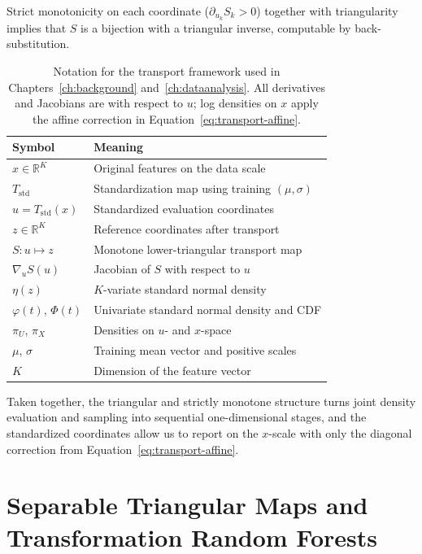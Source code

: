 \documentclass[11pt,a4paper,twoside]{book}\usepackage[]{graphicx}\usepackage[]{xcolor}
\begin{document}
Strict monotonicity on each coordinate ($\partial_{u_k} S_k>0$) together with triangularity implies that $S$ is a bijection with a triangular inverse, computable by back-substitution.

\begin{table}[t]
  \centering
  \caption{Notation for the transport framework used in Chapters~\ref{ch:background} and~\ref{ch:dataanalysis}. All derivatives and Jacobians are with respect to $u$; log densities on $x$ apply the affine correction in Equation~\eqref{eq:transport-affine}.}
  \label{tab:transport-notation}
  \begin{tabular}{ll}
    \hline
    Symbol & Meaning \\ 
    \hline
    $x \in \mathbb{R}^K$ & Original features on the data scale \\ 
    $T_{\mathrm{std}}$ & Standardization map using training $(\mu,\sigma)$ \\ 
    $u = T_{\mathrm{std}}(x)$ & Standardized evaluation coordinates \\ 
    $z \in \mathbb{R}^K$ & Reference coordinates after transport \\ 
    $S:u\mapsto z$ & Monotone lower-triangular transport map \\ 
    $\nabla_u S(u)$ & Jacobian of $S$ with respect to $u$ \\ 
    $\eta(z)$ & $K$-variate standard normal density \\ 
    $\varphi(t)$, $\Phi(t)$ & Univariate standard normal density and CDF \\ 
    $\pi_U$, $\pi_X$ & Densities on $u$- and $x$-space \\ 
    $\mu$, $\sigma$ & Training mean vector and positive scales \\ 
    $K$ & Dimension of the feature vector \\ 
    \hline
  \end{tabular}
\end{table}

Taken together, the triangular and strictly monotone structure turns joint density evaluation
and sampling into sequential one-dimensional stages, and the standardized coordinates allow us
to report on the $x$-scale with only the diagonal correction from Equation~\eqref{eq:transport-affine}.

\section{Separable Triangular Maps and Transformation Random Forests}\label{sec:transport-separable}
\end{document}

